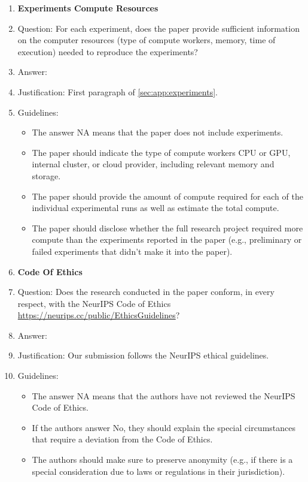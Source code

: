 \documentclass{article}
\theoremstyle{plain}
\theoremstyle{definition}
\theoremstyle{remark}
\theoremstyle{remark}
\begin{document}
\begin{enumerate}
\item {\bf Experiments Compute Resources}
    \item[] Question: For each experiment, does the paper provide sufficient information on the computer resources (type of compute workers, memory, time of execution) needed to reproduce the experiments?
    \item[] Answer: \answerYes{} %
    \item[] Justification: First paragraph of \autoref{sec:app:experiments}.
    \item[] Guidelines:
    \begin{itemize}
        \item The answer NA means that the paper does not include experiments.
        \item The paper should indicate the type of compute workers CPU or GPU, internal cluster, or cloud provider, including relevant memory and storage.
        \item The paper should provide the amount of compute required for each of the individual experimental runs as well as estimate the total compute. 
        \item The paper should disclose whether the full research project required more compute than the experiments reported in the paper (e.g., preliminary or failed experiments that didn't make it into the paper). 
    \end{itemize}
    
\item {\bf Code Of Ethics}
    \item[] Question: Does the research conducted in the paper conform, in every respect, with the NeurIPS Code of Ethics \url{https://neurips.cc/public/EthicsGuidelines}?
    \item[] Answer: \answerYes{} %
    \item[] Justification: Our submission follows the NeurIPS ethical guidelines.
    \item[] Guidelines:
    \begin{itemize}
        \item The answer NA means that the authors have not reviewed the NeurIPS Code of Ethics.
        \item If the authors answer No, they should explain the special circumstances that require a deviation from the Code of Ethics.
        \item The authors should make sure to preserve anonymity (e.g., if there is a special consideration due to laws or regulations in their jurisdiction).
    \end{itemize}



\end{enumerate}
\end{document}
